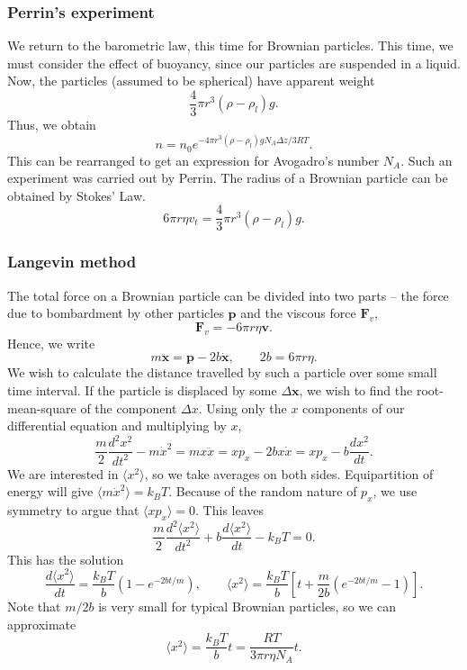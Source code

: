 \documentclass[11pt]{article}
\newcommand\ve[1]{\boldsymbol{#1}}
\newcommand\ddt[1]{\frac{d #1}{d t}}
\newcommand\dd[3][]{\frac{d^{#1}{#2}}{d {#3}^{#1}}}
\newcommand\E[1]{\langle #1 \rangle}
\theoremstyle{definition}
\theoremstyle{remark}
\numberwithin{equation}{section}
\begin{document}
    \subsubsection{Perrin's experiment}
    We return to the barometric law, this time for Brownian particles. This time, we
    must consider the effect of buoyancy, since our particles are suspended in a
    liquid. Now, the particles (assumed to be spherical) have apparent weight \[
        \frac{4}{3}\pi r^3(\rho - \rho_{l})g.
    \] Thus, we obtain \[
        n = n_0 e^{-4\pi r^3(\rho - \rho_l)gN_A\Delta z / 3R T}.
    \] This can be rearranged to get an expression for Avogadro's number $N_A$. Such
    an experiment was carried out by Perrin. The radius of a Brownian particle can
    be obtained by Stokes' Law. \[
        6\pi r \eta v_{t} = \frac{4}{3}\pi r^3(\rho - \rho_l)g.
    \] 

    \subsubsection{Langevin method}
    The total force on a Brownian particle can be divided into two parts -- the
    force due to bombardment by other particles $\ve{p}$ and the viscous force
    $\ve{F}_v$, \[
        \ve{F}_v = -6\pi r \eta \ve{v}.
    \] Hence, we write \[
        m\ddot{\ve{x}} = \ve{p} - 2b\dot{\ve{x}}, \qquad 2b = 6\pi r\eta.
    \] We wish to calculate the distance travelled by such a particle over some
    small time interval. If the particle is displaced by some $\Delta \ve{x}$, we
    wish to find the root-mean-square of the component $\Delta x$. Using only the
    $x$ components of our differential equation and multiplying by $x$, \[
        \frac{m}{2}\dd[2]{x^2}{t} - m\dot{x}^2 =  mx\ddot{x} = xp_x - 2bx\dot{x} =
        xp_x - b\ddt{x^2}.
    \] We are interested in $\E{x^2}$, so we take averages on both sides.
    Equipartition of energy will give $\E{m\dot{x}^2} = k_B T$. Because of the
    random nature of $p_x$, we use symmetry to argue that $\E{xp_x} = 0$. This
    leaves \[
        \frac{m}{2}\dd[2]{\E{x^2}}{t} + b\ddt{\E{x^2}} - k_BT = 0.
    \] This has the solution \[
        \ddt{\E{x^2}} = \frac{k_B T}{b}(1 - e^{-2bt / m}), \qquad \E{x^2} =
        \frac{k_B T}{b}\left[t + \frac{m}{2b}(e^{-2bt / m} - 1)\right].
    \] Note that $m / 2b$ is very small for typical Brownian particles, so we can
    approximate \[
        \E{x^2} = \frac{k_BT}{b}t = \frac{RT}{3\pi r\eta N_A} t.
    \] 
\end{document}
